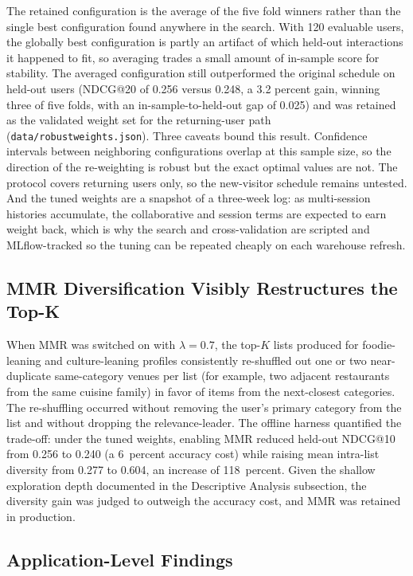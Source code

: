\documentclass[12pt,letterpaper]{article}
\newcommand{\codeunderscore}{\discretionary{\textunderscore}{}{\textunderscore}}
\newcommand{\code}[1]{\begingroup\let\_\codeunderscore\texttt{\small #1}\endgroup}
\begin{document}
The retained configuration is the average of the five fold winners
rather than the single best configuration found anywhere in the
search. With 120 evaluable users, the globally best configuration is
partly an artifact of which held-out interactions it happened to
fit, so averaging trades a small amount of in-sample score for
stability. The averaged configuration still outperformed the
original schedule on held-out users (NDCG@20 of 0.256 versus 0.248,
a 3.2 percent gain, winning three of five folds, with an
in-sample-to-held-out gap of 0.025) and was retained as the
validated weight set for the returning-user path
(\code{data/robust\_weights.json}). Three caveats bound this result.
Confidence intervals between neighboring configurations overlap at
this sample size, so the direction of the re-weighting is robust but
the exact optimal values are not. The protocol covers returning
users only, so the new-visitor schedule remains untested. And the
tuned weights are a snapshot of a three-week log: as multi-session
histories accumulate, the collaborative and session terms are
expected to earn weight back, which is why the search and
cross-validation are scripted and MLflow-tracked so the tuning can
be repeated cheaply on each warehouse refresh.

\subsection{MMR Diversification Visibly Restructures the Top-K}

When MMR was switched on with $\lambda = 0.7$, the top-$K$ lists
produced for foodie-leaning and culture-leaning profiles consistently
re-shuffled out one or two near-duplicate same-category venues per
list (for example, two adjacent restaurants from the same cuisine
family) in favor of items from the next-closest categories. The
re-shuffling occurred without removing the user's primary category
from the list and without dropping the relevance-leader. The offline
harness quantified the trade-off: under the tuned weights, enabling
MMR reduced held-out NDCG@10 from 0.256 to 0.240 (a 6~percent
accuracy cost) while raising mean intra-list diversity from 0.277 to
0.604, an increase of 118~percent. Given the shallow exploration
depth documented in the Descriptive Analysis subsection, the diversity gain was
judged to outweigh the accuracy cost, and MMR was retained in
production.

\subsection{Application-Level Findings}
\end{document}
